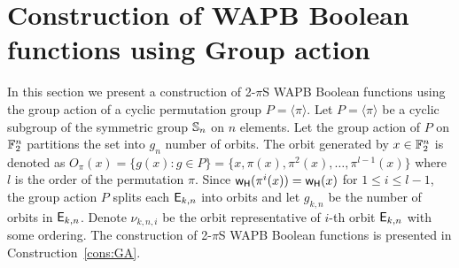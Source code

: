 \documentclass{llncs}
\begin{document}
\section{Construction of WAPB Boolean functions using Group action}\label{sec:GA}
In this section we present a construction of 2-$\pi$S WAPB Boolean functions using the group action of a cyclic permutation group $P = \langle \pi \rangle$. 
Let $P = \langle \pi \rangle$ be a cyclic subgroup of the symmetric group $\mathbb{S}_n$ on $n$ elements. Let the group action of $P$ on $\mathbb{F}_2^n$ partitions the set into $g_n$ number of orbits. 
The orbit generated by $x \in \mathbb{F}_2^n$ is denoted as $O_\pi(x) = \{g(x) : g \in P\} = \{x , \pi(x), \pi^2 (x),\ldots ,\pi^{l-1}(x)\}$ where $l$ is the order of the permutation $\pi$. 
Since $\mathsf{w_H}(\pi^{i}(x)) = \mathsf{w_H}(x)$ for $1 \leq i \leq {l-1}$, the group action $P$ splits each $\mathsf{E}_{k,n}$ into orbits and let $g_{k,n}$ be the number of orbits in $\mathsf{E}_{k,n}$.
Denote $\nu_{k,n,i}$ be the orbit representative of $i$-th orbit $\mathsf{E}_{k,n}$ with some ordering.
The construction of 2-$\pi$S WAPB Boolean functions is presented in Construction~\ref{cons:GA}.
\end{document}
